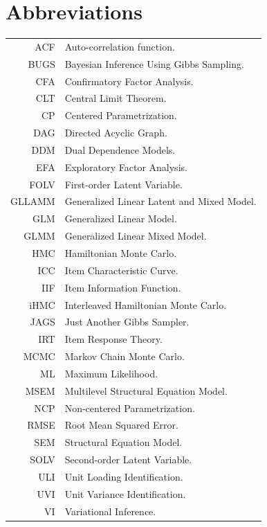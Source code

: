 \documentclass[12pt,a4paper,oneside]{book}
\begin{document}
\chapter*{Abbreviations}

\begin{tabular}{rl}
	ACF		& Auto-correlation function.\\
	BUGS	& Bayesian Inference Using Gibbs Sampling.\\
	CFA		& Confirmatory Factor Analysis. \\
	CLT		& Central Limit Theorem. \\
	CP		& Centered Parametrization.\\
	DAG		& Directed Acyclic Graph.\\
	DDM		& Dual Dependence Models.\\
	EFA		& Exploratory Factor Analysis. \\
	FOLV	& First-order Latent Variable. \\
	GLLAMM	& Generalized Linear Latent and Mixed Model. \\
	GLM		& Generalized Linear Model. \\
	GLMM	& Generalized Linear Mixed Model. \\
	HMC		& Hamiltonian Monte Carlo.\\
	ICC		& Item Characteristic Curve.\\
	IIF		& Item Information Function.\\
	iHMC	& Interleaved Hamiltonian Monte Carlo.\\
	JAGS	& Just Another Gibbs Sampler.\\
	IRT		& Item Response Theory. \\
	MCMC	& Markov Chain Monte Carlo.\\
	ML		& Maximum Likelihood.\\
	MSEM	& Multilevel Structural Equation Model.\\
	NCP		& Non-centered Parametrization.\\
	RMSE	& Root Mean Squared Error.\\
	SEM		& Structural Equation Model. \\
	SOLV	& Second-order Latent Variable.\\
	ULI		& Unit Loading Identification.\\
	UVI		& Unit Variance Identification.\\
	VI		& Variational Inference.
	
\end{tabular}
%
%
\end{document}
